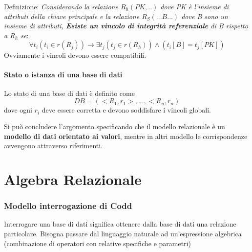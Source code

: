 \documentclass[10pt,twocolumn]{article}
\begin{document}
Definizione:\newline
\textit{\large Considerando la relazione $R_h (PK,..)$ dove PK è l'insieme di attributi della chiave principale e la relazione $R_S(...B...)$ dove B sono un insieme di attributi, \textbf{Esiste un vincolo di integrità referenziale} di B rispetto a $R_h$ se}: \[\forall t_i (t_i \in r(R_j))\rightarrow \exists t_j (t_j \in r(R_h)) \land (t_i[B] = t_j[PK])\]
Ovviamente i vincoli devono essere compatibili.
\subsection{Stato o istanza di una base di dati}
Lo stato di una base di dati è definito come \[ DB= (<R_1 , r_1>,...,<R_n,r_n)\]
dove ogni $r_i$ deve essere corretta e devono soddisfare i vincoli globali.

Si può concludere l'argomento specificando che il modello relazionale è un \textbf{modello di dati orientato ai valori}, mentre in altri modello le corrispondenze avvengono attraverso riferimenti.
\clearpage
\part{Algebra Relazionale}
\section{Modello interrogazione di Codd}
Interrogare una base di dati significa ottenere dalla base di dati una relazione particolare.
Bisogna passare dal linguaggio naturale ad un'espressione algebrica (combinazione di operatori con relative specifiche e parametri)
\end{document}
